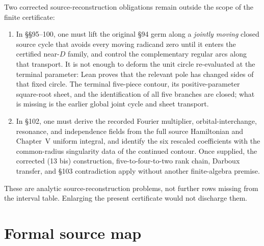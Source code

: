 \documentclass[11pt]{article}
\begin{document}
Two corrected source-reconstruction obligations remain outside the scope of the finite
certificate:
\begin{enumerate}
\item In \S\S95--100, one must lift the original \S94 germ along a \emph{jointly moving} closed
source cycle that avoids every moving radicand zero until it enters the certified near-$D$
family, and control the complementary regular arcs along that transport.  It is not
enough to deform the unit circle re-evaluated at the terminal parameter: Lean proves that the
relevant pole has changed sides of that fixed circle.  The terminal five-piece contour, its
positive-parameter square-root sheet, and the identification of all five branches are closed;
what is missing is the earlier global joint cycle and sheet transport.

\item In \S102, one must derive the recorded Fourier multiplier, orbital-interchange, resonance,
and independence fields from the full source Hamiltonian and Chapter~V uniform integral, and
identify the six rescaled coefficients with the common-radius singularity data of the continued
contour.  Once supplied, the corrected (13 bis) construction, five-to-four-to-two rank chain,
Darboux transfer, and \S103 contradiction apply without another finite-algebra premise.
\end{enumerate}

These are analytic source-reconstruction problems, not further rows missing from the interval
table.  Enlarging the present certificate would not discharge them.

\section{Formal source map}
\end{document}
